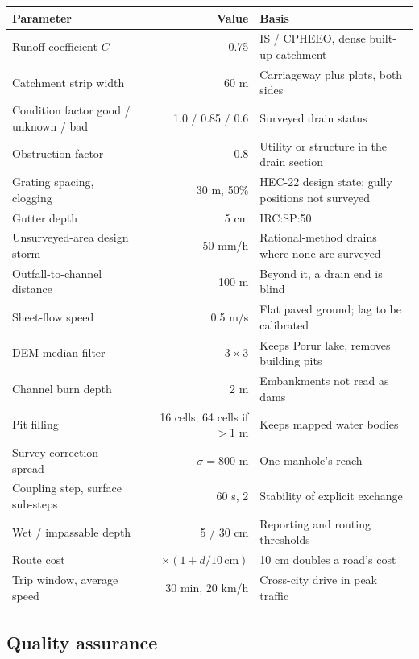 \documentclass[11pt,a4paper]{article}
\begin{document}
{\small
\begin{longtable}{@{}p{4.2cm}r p{7.3cm}@{}}
\toprule
\textbf{Parameter} & \textbf{Value} & \textbf{Basis}\\
\midrule\endhead
Runoff coefficient $C$ & 0.75 & IS / CPHEEO, dense built-up catchment\\
Catchment strip width & 60 m & Carriageway plus plots, both sides\\
Condition factor good / unknown / bad & 1.0 / 0.85 / 0.6 & Surveyed drain status\\
Obstruction factor & 0.8 & Utility or structure in the drain section\\
Grating spacing, clogging & 30 m, 50\% & HEC-22 design state; gully positions not surveyed\\
Gutter depth & 5 cm & IRC:SP:50\\
Unsurveyed-area design storm & 50 mm/h & Rational-method drains where none are surveyed\\
Outfall-to-channel distance & 100 m & Beyond it, a drain end is blind\\
Sheet-flow speed & 0.5 m/s & Flat paved ground; lag to be calibrated\\
DEM median filter & $3\times3$ & Keeps Porur lake, removes building pits\\
Channel burn depth & 2 m & Embankments not read as dams\\
Pit filling & 16 cells; 64 cells if $>$1 m & Keeps mapped water bodies\\
Survey correction spread & $\sigma = 800$ m & One manhole's reach\\
Coupling step, surface sub-steps & 60 s, 2 & Stability of explicit exchange\\
Wet / impassable depth & 5 / 30 cm & Reporting and routing thresholds\\
Route cost & $\times(1 + d/10\,\text{cm})$ & 10 cm doubles a road's cost\\
Trip window, average speed & 30 min, 20 km/h & Cross-city drive in peak traffic\\
\bottomrule
\end{longtable}}

\subsection{Quality assurance}
\label{sec:qa}
\end{document}
